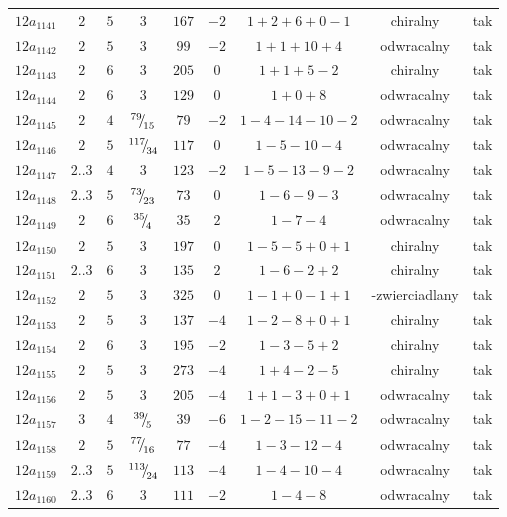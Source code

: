 \begin{longtable}{ccccccccc}
$12a_{1141}$ & $2$ & $5$ & $3$ & $167$ & $-2$ & $1+2+6+0-1$ & chiralny & tak \\
$12a_{1142}$ & $2$ & $5$ & $3$ & $99$ & $-2$ & $1+1+10+4$ & odwracalny & tak \\
$12a_{1143}$ & $2$ & $6$ & $3$ & $205$ & $0$ & $1+1+5-2$ & chiralny & tak \\
$12a_{1144}$ & $2$ & $6$ & $3$ & $129$ & $0$ & $1+0+8$ & odwracalny & tak \\
$12a_{1145}$ & $2$ & $4$ & ${}^{79}{\mskip -5mu/\mskip -3mu}_{15}$ & $79$ & $-2$ & $1-4-14-10-2$ & odwracalny & tak \\
$12a_{1146}$ & $2$ & $5$ & ${}^{117}{\mskip -5mu/\mskip -3mu}_{34}$ & $117$ & $0$ & $1-5-10-4$ & odwracalny & tak \\
$12a_{1147}$ & $2..3$ & $4$ & $3$ & $123$ & $-2$ & $1-5-13-9-2$ & odwracalny & tak \\
$12a_{1148}$ & $2..3$ & $5$ & ${}^{73}{\mskip -5mu/\mskip -3mu}_{23}$ & $73$ & $0$ & $1-6-9-3$ & odwracalny & tak \\
$12a_{1149}$ & $2$ & $6$ & ${}^{35}{\mskip -5mu/\mskip -3mu}_{4}$ & $35$ & $2$ & $1-7-4$ & odwracalny & tak \\
$12a_{1150}$ & $2$ & $5$ & $3$ & $197$ & $0$ & $1-5-5+0+1$ & chiralny & tak \\
$12a_{1151}$ & $2..3$ & $6$ & $3$ & $135$ & $2$ & $1-6-2+2$ & chiralny & tak \\
$12a_{1152}$ & $2$ & $5$ & $3$ & $325$ & $0$ & $1-1+0-1+1$ & -zwierciadlany & tak \\
$12a_{1153}$ & $2$ & $5$ & $3$ & $137$ & $-4$ & $1-2-8+0+1$ & chiralny & tak \\
$12a_{1154}$ & $2$ & $6$ & $3$ & $195$ & $-2$ & $1-3-5+2$ & chiralny & tak \\
$12a_{1155}$ & $2$ & $5$ & $3$ & $273$ & $-4$ & $1+4-2-5$ & chiralny & tak \\
$12a_{1156}$ & $2$ & $5$ & $3$ & $205$ & $-4$ & $1+1-3+0+1$ & odwracalny & tak \\
$12a_{1157}$ & $3$ & $4$ & ${}^{39}{\mskip -5mu/\mskip -3mu}_{5}$ & $39$ & $-6$ & $1-2-15-11-2$ & odwracalny & tak \\
$12a_{1158}$ & $2$ & $5$ & ${}^{77}{\mskip -5mu/\mskip -3mu}_{16}$ & $77$ & $-4$ & $1-3-12-4$ & odwracalny & tak \\
$12a_{1159}$ & $2..3$ & $5$ & ${}^{113}{\mskip -5mu/\mskip -3mu}_{24}$ & $113$ & $-4$ & $1-4-10-4$ & odwracalny & tak \\
$12a_{1160}$ & $2..3$ & $6$ & $3$ & $111$ & $-2$ & $1-4-8$ & odwracalny & tak \\

\end{longtable}
